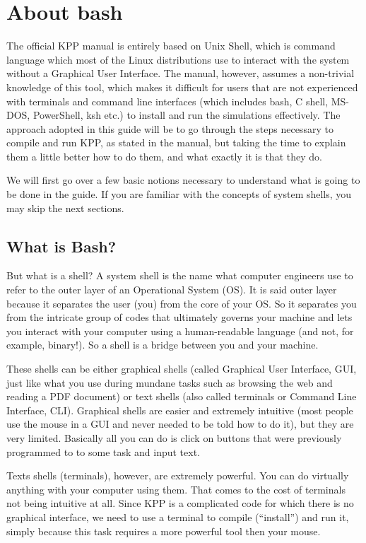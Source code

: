 \documentclass[letterpaper,10pt,openany,oneside]{sphinxmanual}
\begin{document}
\chapter{About bash}
\label{bash:about-bash}\label{bash::doc}
The official KPP manual is entirely based on Unix Shell, which is command
language which most of the Linux distributions use to interact with the system
without a Graphical User Interface. The manual, however, assumes a non-trivial
knowledge of this tool, which makes it difficult for users that are not
experienced with terminals and command line interfaces (which includes bash, C
shell, MS-DOS, PowerShell, ksh etc.) to install and run the simulations
effectively. The approach adopted in this guide will be to go through the steps
necessary to compile and run KPP, as stated in the manual, but taking the time
to explain them a little better how to do them, and what exactly it is that
they do.

We will first go over a few basic notions necessary to understand what is going
to be done in the guide. If you are familiar with the concepts of system shells,
you may skip the next sections.


\section{What is Bash?}
\label{bash:what-is-bash}
But what is a shell? A system shell is the name what computer engineers use to
refer to the outer layer of an Operational System (OS). It is said outer layer
because it separates the user (you) from the core of your OS. So it separates
you from the intricate group of codes that ultimately governs your machine and
lets you interact with your computer using a human-readable language (and not,
for example, binary!). So a shell is a bridge between you and your machine.

These shells can be either graphical shells (called Graphical User Interface,
GUI, just like what you use during mundane tasks such as browsing the web and
reading a PDF document) or text shells (also called terminals or Command Line
Interface, CLI). Graphical shells are easier and extremely intuitive (most
people use the mouse in a GUI and never needed to be told how to do it), but
they are very limited. Basically all you can do is click on buttons that were
previously programmed to to some task and input text.

Texts shells (terminals), however, are extremely powerful. You can do virtually
anything with your computer using them. That comes to the cost of terminals not
being intuitive at all. Since KPP is a complicated code for which there is no
graphical interface, we need to use a terminal to compile (``install'') and run
it, simply because this task requires a more powerful tool then your mouse.
\end{document}
